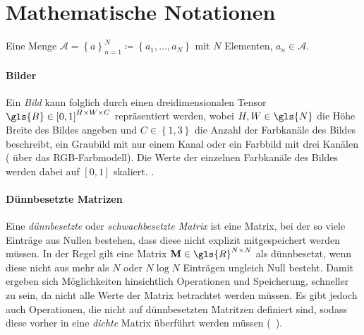 \section{Mathematische Notationen}
\label{mathematische_notationen}



Eine Menge $\mathcal{A} = {\left\{a\right\}}_{n=1}^N \coloneqq \left\{a_1, \ldots, a_N\right\}$ mit $N$ Elementen, $a_n \in \mathcal{A}$.

\paragraph{Bilder}

Ein \emph{Bild} kann folglich durch einen dreidimensionalen Tensor $\gls{B} \in {\left[0, 1\right]}^{H \times W \times C}$ repräsentiert werden, wobei $H, W \in \gls{N}$ die Höhe \bzw{} Breite des Bildes angeben und $C \in \left\{1, 3\right\}$ die Anzahl der Farbkanäle des Bildes beschreibt, \dhe{} ein Graubild mit nur einem Kanal oder ein Farbbild mit drei Kanälen (\zB{} über das RGB-Farbmodell).
Die Werte der einzelnen Farbkanäle des Bildes werden dabei auf $\left[0, 1\right]$ skaliert.
.

\paragraph{Dünnbesetzte Matrizen}

Eine \emph{dünnbesetzte} oder \emph{schwachbesetzte Matrix} ist eine Matrix, bei der so viele Einträge aus Nullen bestehen, dass diese nicht explizit mitgespeichert werden müssen.
In der Regel gilt eine Matrix $\ma{M}\in \gls{R}^{N \times N}$ als dünnbesetzt, wenn diese nicht aus mehr als $N$ oder $N \log N$ Einträgen ungleich Null besteht.
Damit ergeben sich Möglichkeiten hinsichtlich Operationen und Speicherung, schneller zu sein, da nicht alle Werte der Matrix betrachtet werden müssen.
Es gibt jedoch auch Operationen, die nicht auf dünnbesetzten Matritzen definiert sind, sodass diese vorher in eine \emph{dichte} Matrix überführt werden müssen (\vgl{}~\cite{Saad}).
